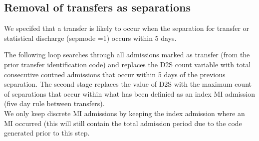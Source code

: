\documentclass[11pt]{article}
\begin{document}
\subsection{Removal of transfers as separations}
We specifed that a transfer is likely to occur when the separation for transfer or statistical discharge (sepmode =1) occurs within 5 days. 
\color{violet}
\begin{stlog}\end{stlog}
\color{black}
The following loop searches through all admissions marked as transfer (from the prior transfer identification code) and replaces the D2S count variable with total consecutive coutned admissions that occur within 5 days of the previous separation. The second stage replaces the value of D2S with the maximum count of separations that occur within what has been definied as an index MI admission (five day rule between transfers). \\
We only keep discrete MI admissions by keeping the index admission where an MI occurred (this will still contain the total admission period due to the code generated prior to this step. 
\color{violet}
\begin{stlog}\end{stlog}
\color{black}
\end{document}
